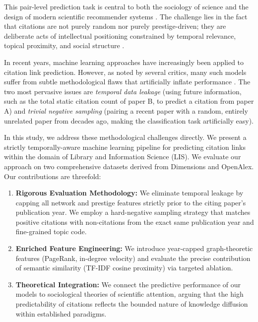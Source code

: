 \documentclass[11pt,a4paper]{article}
\begin{document}
This pair-level prediction task is central to both the sociology of science and the design of modern scientific recommender systems \cite{shibata2012link, bhagavatula2018content}. The challenge lies in the fact that citations are not purely random nor purely prestige-driven; they are deliberate acts of intellectual positioning constrained by temporal relevance, topical proximity, and social structure \cite{kuhn1962structure, bornmann2008what}.

In recent years, machine learning approaches have increasingly been applied to citation link prediction. However, as noted by several critics, many such models suffer from subtle methodological flaws that artificially inflate performance \cite{wang2013quantifying}. The two most pervasive issues are \textit{temporal data leakage} (using future information, such as the total static citation count of paper B, to predict a citation from paper A) and \textit{trivial negative sampling} (pairing a recent paper with a random, entirely unrelated paper from decades ago, making the classification task artificially easy).

In this study, we address these methodological challenges directly. We present a strictly temporally-aware machine learning pipeline for predicting citation links within the domain of Library and Information Science (LIS). We evaluate our approach on two comprehensive datasets derived from Dimensions and OpenAlex. Our contributions are threefold:
\begin{enumerate}
    \item \textbf{Rigorous Evaluation Methodology:} We eliminate temporal leakage by capping all network and prestige features strictly prior to the citing paper's publication year. We employ a hard-negative sampling strategy that matches positive citations with non-citations from the exact same publication year and fine-grained topic code.
    \item \textbf{Enriched Feature Engineering:} We introduce year-capped graph-theoretic features (PageRank, in-degree velocity) and evaluate the precise contribution of semantic similarity (TF-IDF cosine proximity) via targeted ablation.
    \item \textbf{Theoretical Integration:} We connect the predictive performance of our models to sociological theories of scientific attention, arguing that the high predictability of citations reflects the bounded nature of knowledge diffusion within established paradigms.
\end{enumerate}
\end{document}
